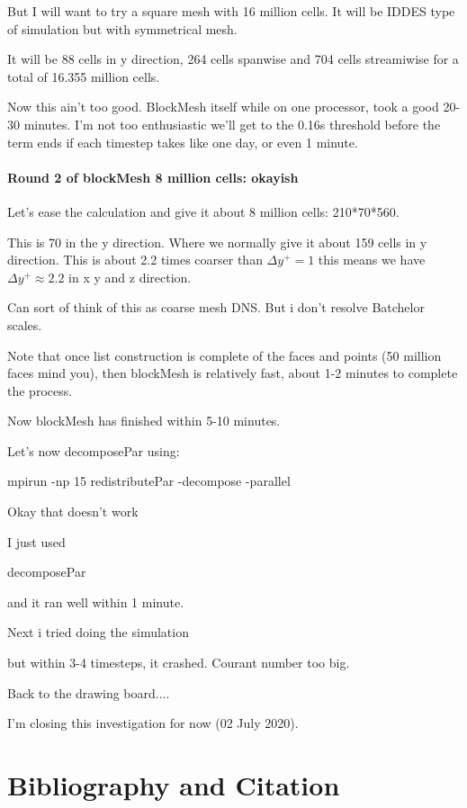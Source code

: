 \documentclass[12pt]{article}
\renewcommand{\_}{\kern-1.5pt\textunderscore\kern-1.5pt}
\begin{document}
But I will want to try a square mesh with 16 million cells. It will be IDDES type of simulation but with symmetrical mesh.


It will be 88 cells in y direction, 264 cells spanwise and 704 cells streamiwise for a total of 16.355 million cells.



Now this ain't too good. BlockMesh itself while on one processor, took a good 20-30 minutes. I'm not too enthusiastic we'll get to the 0.16s threshold before the term ends if each timestep takes like one day, or even 1 minute.

\subsection{Round 2 of blockMesh 8 million cells: okayish}

Let's ease the calculation and give it about 8 million cells:
210*70*560.

This is 70 in the y direction. Where we normally give it about 159 cells in y direction. This is about 2.2 times coarser than $\Delta {y}^{+} = 1$ this means we have $\Delta {y}^{+} \approx  2.2$ in x y and z direction.


Can sort of think of this as coarse mesh DNS. But i don't resolve Batchelor scales.



Note that once list construction is complete of the faces and points (50 million faces mind you), then blockMesh is relatively fast, about 1-2 minutes to complete the process.


Now blockMesh has finished within 5-10 minutes.


Let's now decomposePar using:


mpirun -np 15 redistributePar -decompose -parallel 


Okay that doesn't work



I just used 


decomposePar


and it ran well within 1 minute.



Next i tried doing the simulation


but within 3-4 timesteps, it crashed. Courant number too big.



Back to the drawing board....


I'm closing this investigation for now (02 July 2020).


\vspace{\baselineskip}
\part{Bibliography and Citation}

\printbibliography
\end{document}
